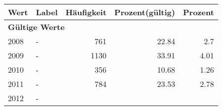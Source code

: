      \begin{longtable}{lXrrr}
     \toprule
     \textbf{Wert} & \textbf{Label} & \textbf{Häufigkeit} & \textbf{Prozent(gültig)} & \textbf{Prozent} \\
     \endhead
     \midrule
     \multicolumn{5}{l}{\textbf{Gültige Werte}}\\

     2008 &
     \multicolumn{1}{X}{ -  } &


       \num{761} &
       \num[round-mode=places,round-precision=2]{22.84} &
         \num[round-mode=places,round-precision=2]{2.7} \\

     2009 &
     \multicolumn{1}{X}{ -  } &


       \num{1130} &
       \num[round-mode=places,round-precision=2]{33.91} &
         \num[round-mode=places,round-precision=2]{4.01} \\

     2010 &
     \multicolumn{1}{X}{ -  } &


       \num{356} &
       \num[round-mode=places,round-precision=2]{10.68} &
         \num[round-mode=places,round-precision=2]{1.26} \\

     2011 &
     \multicolumn{1}{X}{ -  } &


       \num{784} &
       \num[round-mode=places,round-precision=2]{23.53} &
         \num[round-mode=places,round-precision=2]{2.78} \\

     2012 &
     \multicolumn{1}{X}{ -  } &



\end{longtable}
